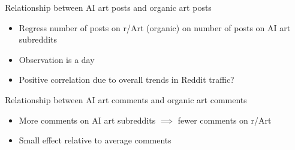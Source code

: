 \documentclass[aspectratio=169]{beamer}
\begin{document}
\begin{frame}{Relationship between AI art posts and organic art posts}
	\centering
	\resizebox*{!}{4cm}{
		
	}
	\begin{itemize}
		\item Regress number of posts on r/Art (organic) on number of posts on AI art subreddits
		\item Observation is a day
		\item Positive correlation due to overall trends in Reddit traffic?
	\end{itemize}
\end{frame}

\begin{frame}{Relationship between AI art comments and organic art comments}
	\centering
	\resizebox*{!}{4cm}{
		
	}
	\begin{itemize}
		\item More comments on AI art subreddits $\implies$ fewer comments on r/Art
		\item Small effect relative to average comments
	\end{itemize}
\end{frame}
\end{document}

